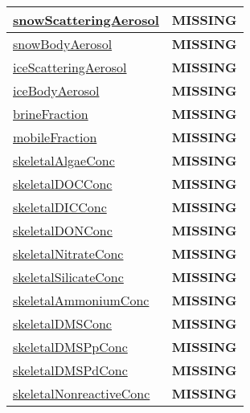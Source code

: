 {\begin{center}
\begin{longtable}{| p{2.0in} | p{4.0in} |}
    \hline
    \hyperref[subsec:var_sec_tracers_snowScatteringAerosol]{snowScatteringAerosol} & {\bf \color{red} MISSING} \\
    \hline
    \hyperref[subsec:var_sec_tracers_snowBodyAerosol]{snowBodyAerosol} & {\bf \color{red} MISSING} \\
    \hline
    \hyperref[subsec:var_sec_tracers_iceScatteringAerosol]{iceScatteringAerosol} & {\bf \color{red} MISSING} \\
    \hline
    \hyperref[subsec:var_sec_tracers_iceBodyAerosol]{iceBodyAerosol} & {\bf \color{red} MISSING} \\
    \hline
    \hyperref[subsec:var_sec_tracers_brineFraction]{brineFraction} & {\bf \color{red} MISSING} \\
    \hline
    \hyperref[subsec:var_sec_tracers_mobileFraction]{mobileFraction} & {\bf \color{red} MISSING} \\
    \hline
    \hyperref[subsec:var_sec_tracers_skeletalAlgaeConc]{skeletalAlgaeConc} & {\bf \color{red} MISSING} \\
    \hline
    \hyperref[subsec:var_sec_tracers_skeletalDOCConc]{skeletalDOCConc} & {\bf \color{red} MISSING} \\
    \hline
    \hyperref[subsec:var_sec_tracers_skeletalDICConc]{skeletalDICConc} & {\bf \color{red} MISSING} \\
    \hline
    \hyperref[subsec:var_sec_tracers_skeletalDONConc]{skeletalDONConc} & {\bf \color{red} MISSING} \\
    \hline
    \hyperref[subsec:var_sec_tracers_skeletalNitrateConc]{skeletalNitrateConc} & {\bf \color{red} MISSING} \\
    \hline
    \hyperref[subsec:var_sec_tracers_skeletalSilicateConc]{skeletalSilicateConc} & {\bf \color{red} MISSING} \\
    \hline
    \hyperref[subsec:var_sec_tracers_skeletalAmmoniumConc]{skeletalAmmoniumConc} & {\bf \color{red} MISSING} \\
    \hline
    \hyperref[subsec:var_sec_tracers_skeletalDMSConc]{skeletalDMSConc} & {\bf \color{red} MISSING} \\
    \hline
    \hyperref[subsec:var_sec_tracers_skeletalDMSPpConc]{skeletalDMSPpConc} & {\bf \color{red} MISSING} \\
    \hline
    \hyperref[subsec:var_sec_tracers_skeletalDMSPdConc]{skeletalDMSPdConc} & {\bf \color{red} MISSING} \\
    \hline
    \hyperref[subsec:var_sec_tracers_skeletalNonreactiveConc]{skeletalNonreactiveConc} & {\bf \color{red} MISSING} \\

\end{longtable}
\end{center}}
